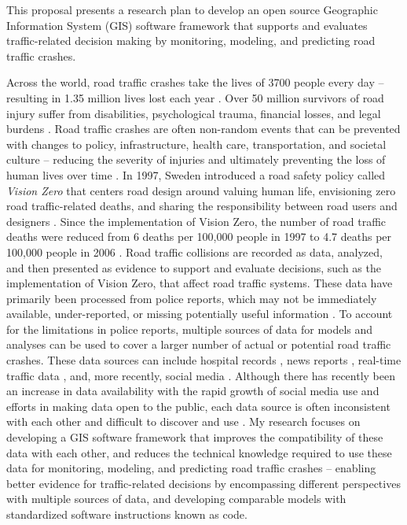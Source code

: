 
This proposal presents a research plan to develop an open source Geographic Information System (GIS) software framework that supports and evaluates traffic-related decision making by monitoring, modeling, and predicting road traffic crashes. 

Across the world, road traffic crashes take the lives of 3700 people every day -- resulting in 1.35 million lives lost each year \cite{who2018roadsafetyreport}. Over 50 million survivors of road injury suffer from disabilities, psychological trauma, financial losses, and legal burdens \cite{who2016postcrashresponse}. Road traffic crashes are often non-random events that can be prevented with changes to policy, infrastructure, health care, transportation, and societal culture -- reducing the severity of injuries and ultimately preventing the loss of human lives over time \cite{bonilla2014injuriesnotaccidents,brubacher2014reduceroadtraumalaw,who2017savelives}. In 1997, Sweden introduced a road safety policy called \textit{Vision Zero} that centers road design around valuing human life, envisioning zero road traffic-related deaths, and sharing the responsibility between road users and designers \cite{belin2012visionzero}. Since the implementation of Vision Zero, the number of road traffic deaths were reduced from 6 deaths per 100,000 people in 1997 to 4.7 deaths per 100,000 people in 2006 \cite{johansson2009visionzero}. Road traffic collisions are recorded as data, analyzed, and then presented as evidence to support and evaluate decisions, such as the implementation of Vision Zero, that affect road traffic systems. These data have primarily been processed from police reports, which may not be immediately available, under-reported, or missing potentially useful information \cite{alsop2001underreportnz,loo2007reportroadcrash}. To account for the limitations in police reports, multiple sources of data for models and analyses can be used to cover a larger number of actual or potential road traffic crashes. These data sources can include hospital records \cite{cryer2001biashospitalpolicereports}, news reports \cite{dandona2004trafficdeathssurveillance}, real-time traffic data \cite{roshandel2015realtimecrashreview}, and, more recently, social media \cite{wanichayapong2011socialtrafficdata}. Although there has recently been an increase in data availability with the rapid growth of social media use \cite{perrin2015socialmediause} and efforts in making data open to the public, each data source is often inconsistent with each other and difficult to discover and use \cite{janssen2012opendata}. My research focuses on developing a GIS software framework that improves the compatibility of these data with each other, and reduces the technical knowledge required to use these data for monitoring, modeling, and predicting road traffic crashes -- enabling better evidence for traffic-related decisions by encompassing different perspectives with multiple sources of data, and developing comparable models with standardized software instructions known as code.

